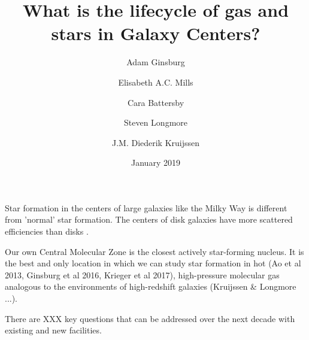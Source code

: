 \documentclass{aastex62}
\begin{document}
\author{Adam Ginsburg}
\author{Elisabeth A.C. Mills}
\author{Cara Battersby}
\author{Steven Longmore}
\author{J.M. Diederik Kruijssen}

\title{What is the lifecycle of gas and stars in Galaxy Centers?}
\date{January 2019}

Star formation in the centers of large galaxies like the Milky Way is different from 'normal' star formation. %
The centers of disk galaxies have more scattered efficiencies than disks \citep{Leroy2013a}. 

Our own Central Molecular Zone is the closest actively star-forming nucleus.
It is the best and only location in which we can study star formation in hot
(Ao et al 2013, Ginsburg et al 2016, Krieger et al 2017), high-pressure
molecular gas analogous to the environments of high-redshift galaxies (Kruijssen \& Longmore ...).


There are XXX key questions that can be addressed over the next decade with existing and new facilities.
\end{document}

